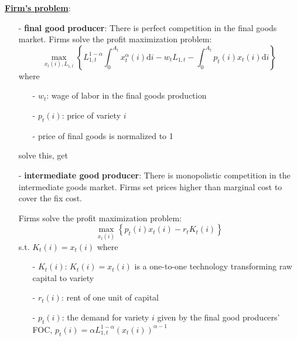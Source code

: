 \documentclass[10pt,landscape,a4paper]{article}
\begin{document}
\begin{multicols*}{3}
\vspace{2pt}
\textbf{\color{myblue}\underline{Firm's problem}}:
\begin{itemize}
    \item[-] \textbf{\color{myblue}final good} \textbf{producer}:
    There is perfect competition in the final goods market. Firms solve the profit maximization problem:
    $$
    \max_{x_t(i),L_{1,t}}\left\{ L_{1,t}^{1-\alpha}\int^{A_t}_0 x_t^{\alpha}(i)\mathrm{d}i-w_tL_{1,t}-\int^{A_t}_0 p_t(i)x_t(i)\mathrm{d}i \right\}
    $$
    where
    \begin{itemize}
        \item[-] $w_t$: wage of labor in the final goods production
        \item[-] $p_t(i)$: price of variety $i$
        \item[-] price of final goods is normalized to 1
    \end{itemize}
    solve this, get
\end{itemize}
\vspace{2pt}

\begin{itemize}
    \item[-] \textbf{\color{myblue}intermediate good} \textbf{producer}:
    There is monopolistic competition in the intermediate goods market. Firms set prices higher than marginal cost to cover the fix cost.
    
    Firms solve the profit maximization problem:
    $$
    \max_{x_t(i)}\left\{ p_t(i)x_t(i)-r_tK_t(i) \right\}
    $$
    s.t. $K_t(i)=x_t(i)$
    where
    \begin{itemize}
        \item[-] $K_t(i)$: $K_t(i)=x_t(i)$ is a one-to-one technology transforming raw capital to variety
        \item[-] $r_t(i)$: rent of one unit of capital
        \item[-] $p_t(i)$: the demand for variety $i$ given by the final good producers' FOC, $p_t(i)=\alpha L_{1,t}^{1-\alpha}(x_t(i))^{\alpha-1}$
    \end{itemize}
    

\end{itemize}
\end{multicols*}
\end{document}
